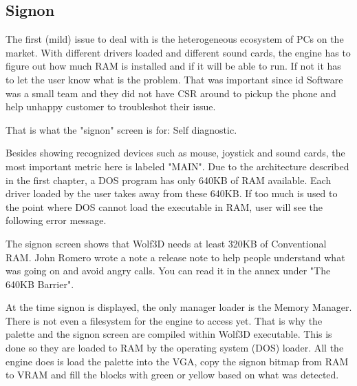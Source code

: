 \documentclass[book.tex]{subfiles}
\begin{document}
\subsection{Signon}
The first (mild) issue to deal with is the heterogeneous ecosystem of PCs on the market. With different drivers loaded and different sound cards, the engine has to figure out how much RAM is installed and if it will be able to run. If not it has to let the user know what is the problem. That was important since id Software was a small team and they did not have CSR around to pickup the phone and help unhappy customer to troubleshot their issue.\\
\par
That is what the "signon" screen is for: Self diagnostic. 
\par
\begin{figure}[H]
\centering
{}
\end{figure}
\par
Besides showing recognized devices such as mouse, joystick and sound cards, the most important metric here is labeled "MAIN". Due to the architecture described in the first chapter, a DOS program has only 640KB of RAM available. Each driver loaded by the user takes away from these 640KB. If too much is used to the point where DOS cannot load the executable in RAM, user will see the following error message.\\
\par 
\begin{minipage}{\textwidth}

\end{minipage}
\par
The signon screen shows that Wolf3D needs at least 320KB of Conventional RAM. John Romero wrote a note a release note to help people understand what was going on and avoid angry calls. You can read it in the annex under "The 640KB Barrier".\\
\par 
At the time signon is displayed, the only manager loader is the Memory Manager. There is not even a filesystem for the engine to access yet. That is why the palette and the signon screen are compiled within Wolf3D executable. This is done so they are loaded to RAM by the operating system (DOS) loader. All the engine does is load the palette into the VGA, copy the signon bitmap from RAM to VRAM and fill the blocks with green or yellow based on what was detected.\\
\par
\end{document}
